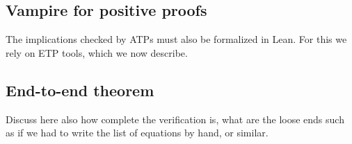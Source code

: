 \subsection{Vampire for positive proofs}

The implications checked by ATPs must also be formalized in Lean.  For this we rely on ETP tools, which we now describe.

\subsection{End-to-end theorem}

Discuss here also how complete the verification is, what are the loose ends such as if we had to write the list of equations by hand, or similar.
